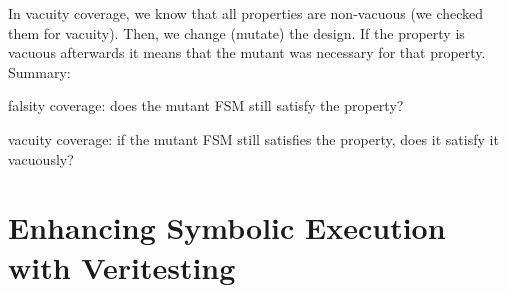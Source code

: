 In vacuity coverage, we know that all properties are non-vacuous (we checked them for vacuity). Then, we change (mutate)
the design. If the property is vacuous afterwards it means that the mutant was necessary for that property.
\linebreak
\linebreak
Summary:

falsity coverage: does the mutant FSM still satisfy the property?

vacuity coverage: if the mutant FSM still satisfies the property, does it satisfy it vacuously?

\section{Enhancing Symbolic Execution with Veritesting \cite{avgerinos2014}}


